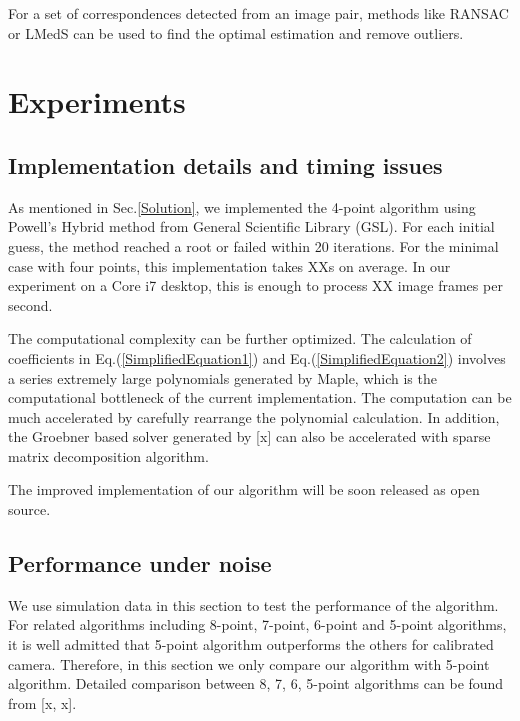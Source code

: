 \documentclass[letterpaper, 10 pt, conference]{ieeeconf}
\begin{document}
For a set of correspondences detected from an image pair, methods like RANSAC or LMedS can be used to find the optimal estimation and remove outliers. 

\section{Experiments}
\subsection{Implementation details and timing issues}
As mentioned in Sec.\ref{Solution}, we implemented the 4-point algorithm using Powell's Hybrid method from General Scientific Library (GSL). For each initial guess, the method reached a root or failed within 20 iterations. For the minimal case with four points, this implementation takes XXs on average. In our experiment on a Core i7 desktop, this is enough to process XX image frames per second. 

The computational complexity can be further optimized. The calculation of coefficients in Eq.(\ref{SimplifiedEquation1}) and Eq.(\ref{SimplifiedEquation2}) involves a series extremely large polynomials generated by Maple, which is the computational bottleneck of the current implementation. The computation can be much accelerated by carefully rearrange the polynomial calculation. In addition, the Groebner based solver generated by [x] can also be accelerated with sparse matrix decomposition algorithm. 

The improved implementation of our algorithm will be soon released as open source. 

\subsection{Performance under noise}
We use simulation data in this section to test the performance of the algorithm. For related algorithms including 8-point, 7-point, 6-point and 5-point algorithms, it is well admitted that 5-point algorithm outperforms the others for calibrated camera. Therefore, in this section we only compare our algorithm with 5-point algorithm. Detailed comparison between 8, 7, 6, 5-point algorithms can be found from [x, x]. 
\end{document}

